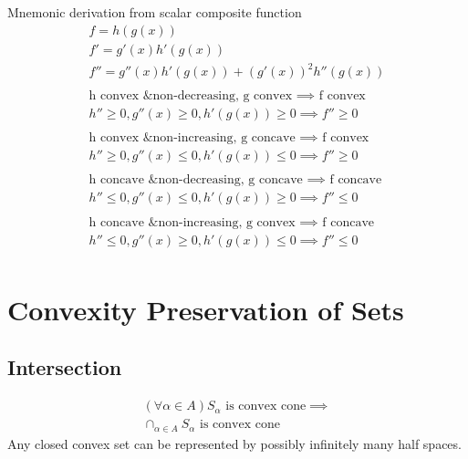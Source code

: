\documentclass[8pt]{extarticle}
\begin{document}
\begin{multicols*}{2}
  Mnemonic derivation from scalar composite function
  \begin{align*}
    f=h(g(x))\\
    f'=g'(x)h'(g(x))\\
    f''=g''(x)h'(g(x)) + (g'(x))^2 h''(g(x))\\
    \\
    \text{h convex \& non-decreasing, g convex } \implies \text{ f convex}\\
    h'' \geq 0, g''(x) \geq 0, h'(g(x)) \geq 0 \implies f'' \geq 0\\
    \\
    \text{h convex \& non-increasing, g concave } \implies \text{ f convex}\\
    h'' \geq 0, g''(x) \leq 0, h'(g(x)) \leq 0 \implies f'' \geq 0\\
    \\
    \text{h concave \& non-decreasing, g concave } \implies \text{ f concave}\\
    h'' \leq 0, g''(x) \leq 0, h'(g(x)) \geq 0 \implies f'' \leq 0\\
    \\
    \text{h concave \& non-increasing, g convex } \implies \text{ f concave}\\
    h'' \leq 0, g''(x) \geq 0, h'(g(x)) \leq 0 \implies f'' \leq 0\\
  \end{align*}

  \vfill\null
  
  \pagebreak
  
  \section{Convexity Preservation of Sets}
  \subsection{Intersection}
  \begin{align*}
    (\forall \alpha \in A) S_{\alpha}\text{ is convex cone} \implies\\
    \cap_{\alpha \in A} S_{\alpha} \text{ is convex cone}
  \end{align*}
  Any closed convex set can be represented by possibly infinitely many half spaces.\\
  

\end{multicols*}
\end{document}
